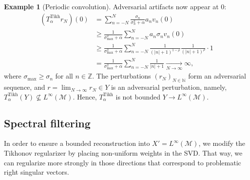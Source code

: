 \documentclass{article}
\theoremstyle{definition}
\newtheorem{example}[theorem]{Example}
\newcommand{\N}{\mathbb{N}}
\newcommand{\Z}{\mathbb{Z}}
\newcommand{\abs}[1]{\left\lvert#1\right\rvert}
\begin{document}
\begin{example}[Periodic convolution]
Adversarial artifacts now appear at \(0\):
\begin{align*}
    \left(T^{\mathrm{Tikh}}_{\alpha} r_N \right)(0)
    &= \sum_{n=-N}^N \frac{\sigma_n }{\sigma_n^2+\alpha}a_n v_n(0)\\
    &\geq
    \frac{1}{\sigma_\mathrm{max}^2+\alpha}
    \sum_{n=-N}^N
    a_n\sigma_n v_n(0)\\
    &\geq
    \frac{1}{\sigma_\mathrm{max}^2+\alpha}
    \sum_{n=-N}^N
    \frac{1}{\left(\abs{n}+1\right)^{1-\rho}}\frac{1}{\left(\abs{n}+1\right)^{\rho}}\cdot 1\\
    &=
    \frac{1}{\sigma_\mathrm{max}^2+\alpha}
    \sum_{n=-N}^N
    \frac{1}{\abs{n}+1}
    \xrightarrow[N\to\infty]{}\infty,
\end{align*}
where \(\sigma_\mathrm{max}\geq \sigma_n\) for all \(n\in\Z\).
The perturbations \((r_N)_{N\in\N}\) form an adversarial sequence, and \(r = \lim_{N\to\infty} r_N\in Y\) is an adversarial perturbation, namely, $T^{\mathrm{Tikh}}_{\alpha}(Y)\not\subseteq L^\infty(\mathcal{M})$.
Hence,
\(T^{\mathrm{Tikh}}_{\alpha}\) is not bounded \(Y\to L^\infty(\mathcal{M})\).
\end{example}

\subsection{Spectral filtering}
In order to ensure a bounded reconstruction into \(X'=L^\infty(\mathcal{M})\),
we modify the Tikhonov regularizer by placing non-uniform weights in the SVD.
That way, we can regularize more strongly in those directions that correspond to problematic right singular vectors.
\end{document}
